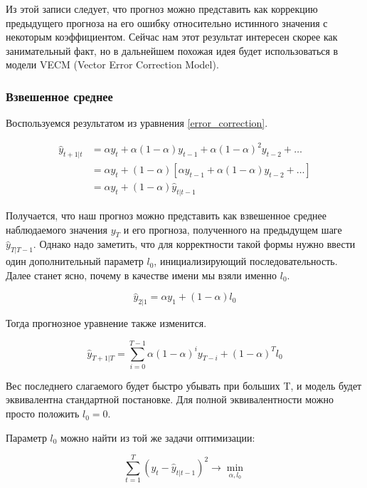 \documentclass[12pt,fleqn]{article}
\begin{document}
Из этой записи следует, что прогноз можно представить как коррекцию предыдущего прогноза на его ошибку относительно истинного значения с некоторым коэффициентом.
Сейчас нам этот результат интересен скорее как занимательный факт, но в дальнейшем похожая идея будет использоваться в модели VECM (Vector Error Correction Model).

\subsubsection{Взвешенное среднее}

Воспользуемся результатом из уравнения \ref{error_correction}.

\begin{equation}
  \begin{split}
    \hat{y}_{t+1|t}
    &= \alpha y_t + \alpha (1-\alpha) y_{t-1} + \alpha (1-\alpha)^2 y_{t-2} + \ldots \\
    &= \alpha y_t +(1-\alpha)[ \alpha y_{t-1} + \alpha (1-\alpha) y_{t-2} + \ldots ] \\
    &=  \alpha y_t +(1-\alpha) \hat{y}_{t|t-1}
  \end{split}
\end{equation}

Получается, что наш прогноз можно представить как взвешенное среднее наблюдаемого значения $y_T$ и его прогноза, полученного на предыдущем шаге $\hat{y}_{T|T-1}$.
Однако надо заметить, что для корректности такой формы нужно ввести один дополнительный параметр $l_0$, инициализирующий последовательность.
Далее станет ясно, почему в качестве имени мы взяли именно $l_0$.

\begin{equation}
  \hat{y}_{2|1} = \alpha y_1 +(1-\alpha) l_0
\end{equation}

Тогда прогнозное уравнение также изменится.

\begin{equation}
  \hat{y}_{T+1|T} = \sum_{i=0}^{T-1} \alpha (1-\alpha)^{i} y_{T-i} + (1-\alpha)^T l_0
\end{equation}

Вес последнего слагаемого будет быстро убывать при больших T, и модель будет эквивалентна стандартной постановке.
Для полной эквивалентности можно просто положить $l_0 = 0$.

Параметр $l_0$ можно найти из той же задачи оптимизации:

\begin{equation}
  \sum_{t=1}^{T}(y_t - \hat{y}_{t|t-1})^2 \rightarrow \min_{\alpha, l_0}
\end{equation}
\end{document}
